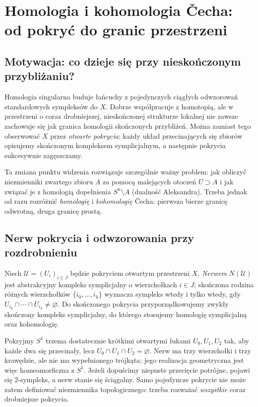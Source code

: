 \chapter{Homologia i kohomologia \v{C}echa: od pokryć do granic przestrzeni}
\label{ch:cech-v4}

\providecommand{\atlasref}[2]{#2}

\section{Motywacja: co dzieje się przy nieskończonym przybliżaniu?}
Homologia singularna buduje łańcuchy z pojedynczych ciągłych odwzorowań
standardowych sympleksów do $X$. Dobrze współpracuje z homotopią,
ale w przestrzeni o coraz drobniejszej, nieskończonej strukturze
lokalnej nie zawsze zachowuje się jak granica homologii
skończonych przybliżeń. Można zamiast tego obserwować $X$
przez \emph{otwarte pokrycia}: każdy układ przecinających się
zbiorów opisujemy skończonym kompleksem symplicjalnym,
a następnie pokrycia sukcesywnie zagęszczamy.

Ta zmiana punktu widzenia rozwiązuje szczególnie ważny problem:
jak obliczyć niezmienniki zwartego zbioru $A$ za pomocą malejących
otoczeń $U\supset A$ i jak związać je z homologią dopełnienia
$S^n\setminus A$ (dualność Aleksandra). Trzeba jednak od razu
rozróżnić \emph{homologię} i \emph{kohomologię} \v{C}echa:
pierwsza bierze granicę odwrotną, druga granicę prostą.

\section{Nerw pokrycia i odwzorowania przy rozdrobnieniu}
\begin{definicja}[Nerw]
Niech $\mathcal U=(U_i)_{i\in J}$ będzie pokryciem otwartym
przestrzeni $X$. \emph{Nerwem} $N(\mathcal U)$ jest abstrakcyjny
kompleks symplicjalny o wierzchołkach $i\in J$; skończona rodzina
różnych wierzchołków $\{i_0,\ldots,i_k\}$ wyznacza sympleks
wtedy i tylko wtedy, gdy $U_{i_0}\cap\cdots\cap U_{i_k}\ne\varnothing$.
Do skończonego pokrycia przyporządkowujemy zwykły skończony
kompleks symplicjalny, do którego stosujemy homologię
symplicjalną oraz kohomologię.
\end{definicja}

\begin{przyklad}[Okrąg]
Pokryjmy $S^1$ trzema dostatecznie krótkimi otwartymi łukami
$U_0,U_1,U_2$ tak, aby każde dwa się przecinały, lecz
$U_0\cap U_1\cap U_2=\varnothing$.
Nerw ma trzy wierzchołki i trzy krawędzie, ale nie ma
wypełnionego trójkąta; jego realizacja geometryczna jest więc
homeomorficzna z $S^1$.
Jeżeli dopuścimy niepuste przecięcie potrójne, pojawi się
$2$-sympleks, a nerw stanie się ściągalny. Samo pojedyncze
pokrycie nie może zatem definiować niezmiennika topologicznego:
trzeba rozważać \emph{wszystkie} coraz drobniejsze pokrycia.
\end{przyklad}

